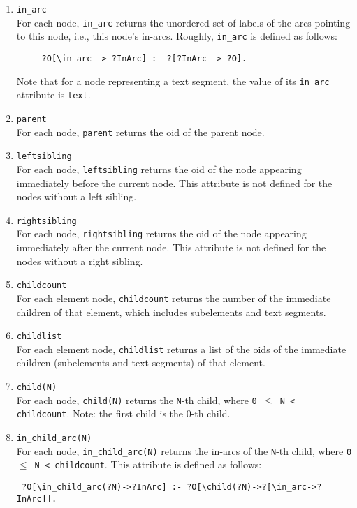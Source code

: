 \begin{enumerate}
\item {\tt \bs{}in\_arc} \\
For each node, {\tt \bs{}in\_arc}  returns the unordered set of labels of the
arcs pointing to this node, i.e., this node's in-arcs. Roughly,
{\tt \bs{}in\_arc}  is defined as follows:
  \begin{verbatim}
     ?O[\in_arc -> ?InArc] :- ?[?InArc -> ?O].
  \end{verbatim}
Note that for a node representing a text segment, the value of
its {\tt \bs{}in\_arc}  attribute is {\tt \bs{}text}. 

\item {\tt \bs{}parent} \\
For each node, {\tt \bs{}parent}  returns the oid of the parent node.

\item {\tt \bs{}leftsibling} \\
For each node, {\tt \bs{}leftsibling}  returns the oid of the node appearing
immediately before the current node. This attribute is not defined
for the nodes without a left sibling.

\item {\tt \bs{}rightsibling} \\
For each node, {\tt \bs{}rightsibling}  returns the oid of the node appearing
immediately after the current node. This attribute is not defined
for the nodes without a right sibling.

\item {\tt \bs{}childcount} \\
For each element node, {\tt \bs{}childcount}  returns the number of the immediate
children of that element,
which includes subelements and text segments.

\item {\tt \bs{}childlist} \\
For each element node, {\tt \bs{}childlist}  returns a list of the
oids of the immediate children (subelements and text segments)
of that element.

\item {\tt \bs{}child(N)} \\
For each node, {\tt \bs{}child(N)} returns the {\tt N}-th child, where {\tt 0
  $\leq$ N < \bs{}childcount}.
Note: the first child is the 0-th child.


\item {\tt \bs{}in\_child\_arc(N)} \\
For each node, {\tt \bs{}in\_child\_arc(N)}  returns the in-arcs of the {\tt N}-th child, where {\tt 0
  $\leq$ N < \bs{}childcount}.
This attribute is defined as follows:
\begin{verbatim}
 ?O[\in_child_arc(?N)->?InArc] :- ?O[\child(?N)->?[\in_arc->?InArc]].
\end{verbatim}
\end{enumerate}

